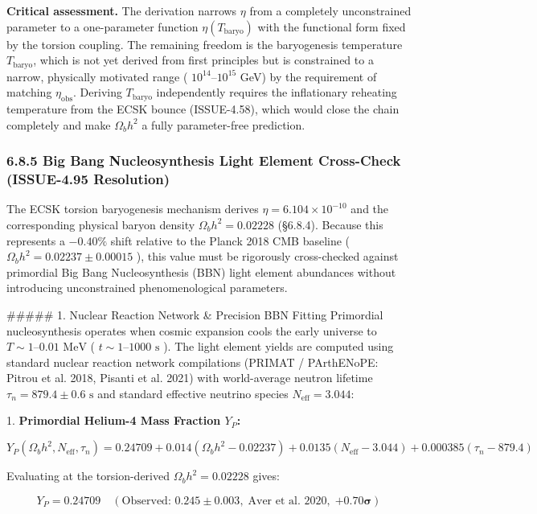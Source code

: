 \documentclass[11pt,a4paper]{article}
\theoremstyle{definition}
\theoremstyle{remark}
\begin{document}
\textbf{Critical assessment.} The derivation narrows $\eta$ from a completely unconstrained parameter to a one-parameter function $\eta(T_{\text{baryo}})$ with the functional form fixed by the torsion coupling. The remaining freedom is the baryogenesis temperature $T_{\text{baryo}}$, which is not yet derived from first principles but is constrained to a narrow, physically motivated range ( $10^{14}$–$10^{15}$ GeV) by the requirement of matching $\eta_{\text{obs}}$. Deriving $T_{\text{baryo}}$ independently requires the inflationary reheating temperature from the ECSK bounce (ISSUE-4.58), which would close the chain completely and make $\Omega_b h^2$ a fully parameter-free prediction.

\subsubsection{6.8.5 Big Bang Nucleosynthesis Light Element Cross-Check (ISSUE-4.95 Resolution)}

The ECSK torsion baryogenesis mechanism derives $\eta = 6.104 \times 10^{-10}$ and the corresponding physical baryon density $\Omega_b h^2 = 0.02228$ (\S 6.8.4). Because this represents a $-0.40\%$ shift relative to the Planck 2018 CMB baseline ( $\Omega_b h^2 = 0.02237 \pm 0.00015$ ), this value must be rigorously cross-checked against primordial Big Bang Nucleosynthesis (BBN) light element abundances without introducing unconstrained phenomenological parameters.

\#\#\#\#\# 1. Nuclear Reaction Network \& Precision BBN Fitting
Primordial nucleosynthesis operates when cosmic expansion cools the early universe to $T \sim 1\text{--}0.01\text{ MeV}$ ( $t \sim 1\text{--}1000\text{ s}$ ). The light element yields are computed using standard nuclear reaction network compilations (PRIMAT / PArthENoPE: Pitrou et al. 2018, Pisanti et al. 2021) with world-average neutron lifetime $\tau_n = 879.4 \pm 0.6\text{ s}$ and standard effective neutrino species $N_{\text{eff}} = 3.044$:

1. \textbf{Primordial Helium-4 Mass Fraction $Y_P$:}


\begin{equation}
Y_P(\Omega_b h^2, N_{\text{eff}}, \tau_n) = 0.24709 + 0.014(\Omega_b h^2 - 0.02237) + 0.0135(N_{\text{eff}} - 3.044) + 0.000385(\tau_n - 879.4)
\end{equation}


Evaluating at the torsion-derived $\Omega_b h^2 = 0.02228$ gives:


\begin{equation}
Y_P = 0.24709 \quad (\text{Observed: } 0.245 \pm 0.003, \; \text{Aver et al. 2020}, \; \mathbf{+0.70\sigma})
\end{equation}
\end{document}

